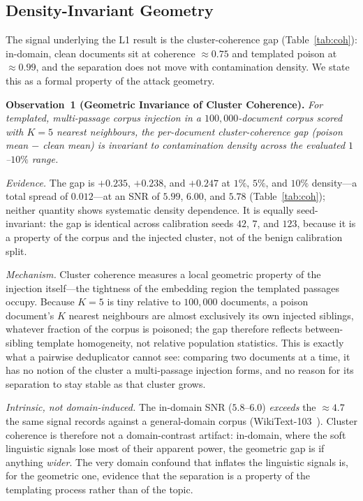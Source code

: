 \documentclass[conference]{IEEEtran}
\begin{document}
\subsection{Density-Invariant Geometry}
\label{subsec:geom}
The signal underlying the L1 result is the cluster-coherence gap
(Table~\ref{tab:coh}): in-domain, clean documents sit at coherence $\approx 0.75$
and templated poison at $\approx 0.99$, and the separation does not move with
contamination density. We state this as a formal property of the attack geometry.

\smallskip
\noindent\textbf{Observation~1 (Geometric Invariance of Cluster Coherence).}
\emph{For templated, multi-passage corpus injection in a $100{,}000$-document
corpus scored with $K=5$ nearest neighbours, the per-document cluster-coherence gap
(poison mean $-$ clean mean) is invariant to contamination density across the
evaluated $1$--$10\%$ range.}

\emph{Evidence.} The gap is $+0.235$, $+0.238$, and $+0.247$ at $1\%$, $5\%$, and
$10\%$ density---a total spread of $0.012$---at an SNR of $5.99$, $6.00$, and $5.78$
(Table~\ref{tab:coh}); neither quantity shows systematic density dependence. It is
equally seed-invariant: the gap is identical across calibration seeds $42$, $7$, and
$123$, because it is a property of the corpus and the injected cluster, not of the
benign calibration split.

\emph{Mechanism.} Cluster coherence measures a local geometric property of the
injection itself---the tightness of the embedding region the templated passages
occupy. Because $K=5$ is tiny relative to $100{,}000$ documents, a poison document's
$K$ nearest neighbours are almost exclusively its own injected siblings, whatever
fraction of the corpus is poisoned; the gap therefore reflects between-sibling
template homogeneity, not relative population statistics. This is exactly what a
pairwise deduplicator cannot see: comparing two documents at a time, it has no
notion of the cluster a multi-passage injection forms, and no reason for its
separation to stay stable as that cluster grows.

\emph{Intrinsic, not domain-induced.} The in-domain SNR ($5.8$--$6.0$) \emph{exceeds}
the $\approx\!4.7$ the same signal records against a general-domain corpus
(WikiText-103~\cite{wikitext}). Cluster coherence is therefore not a domain-contrast
artifact: in-domain, where the soft linguistic signals lose most of their apparent
power, the geometric gap is if anything \emph{wider}. The
very domain confound that inflates the linguistic signals is, for the geometric one,
evidence that the separation is a property of the templating process rather than of
the topic.
\end{document}
